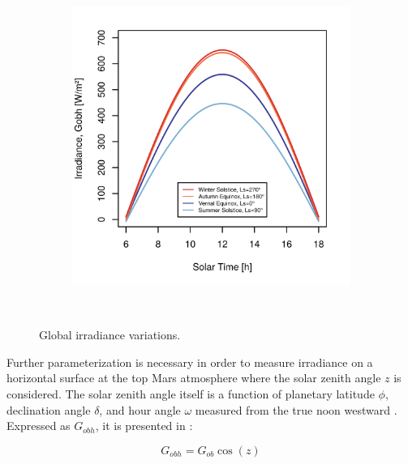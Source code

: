 \begin{figure}[h]
\begin{subfigure}[t]{\subfigureWidth}
            \includegraphics[height=\graphicsHeight]{sections/mars-solar-energy/solar-radiation/plots/gobh-diurnal-over-endaveaour-crater.png}
            \label{fig:plot:diurnal-variation-of-beam-irradiance-on-a-horizontal-surface-at-top-of-mars-atmosphere}
    \end{subfigure}\\[0.8ex]
    \caption[Global irradiance variations]
    {Global irradiance variations.}
    \label{fig:plot:global-irradiance}
\vspace{-2ex}
\end{figure}

\vspace{0.5cm}

Further parameterization is necessary in order to measure irradiance on a horizontal surface at the top Mars atmosphere where the solar zenith angle $z$ is considered. The solar zenith angle itself is a function of planetary latitude $\phi$, declination angle $\delta$, and hour angle $\omega$ measured from the true noon westward . Expressed as $G_{obh}$, it is presented in :

\begin{equation}
  \label{eq:G_obh}
  G_{obh} = G_{ob}\cos{(z)}
\end{equation}

